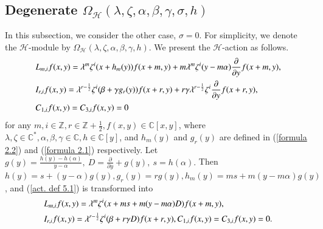 \documentclass[12pt,reqno]{amsart}
\def\Z{\mathbb{Z}}
\def\C{\mathbb{C}}
\numberwithin{equation}{section}
\begin{document}
\subsection{\texorpdfstring{ Degenerate $\Omega_{\mathcal{H}}(\lambda,\zeta,\alpha,\beta,\gamma,\sigma,h)$ }{1}}
In this subsection, we consider the other case, $\sigma=0$. For simplicity, we denote the $\mathcal{H}$-module by 
$\Omega_{\mathcal{H}}(\lambda,\zeta,\alpha,\beta,\gamma,h)$. We present the $\mathcal{H}$-action as follows.
\begin{equation}\label{act. def 5.1}
\aligned
&L_{m,i} f(x,y)=\lambda^m\zeta^i(x+h_{m}(y))f(x+m,y)+m\lambda^m\zeta^i(y-m\alpha)\frac{\partial }{\partial {y}}{f(x+m,y)},\\
&I_{r,i} f(x,y)=\lambda^{r-\frac{1}{2}}\zeta^i(\beta+\gamma g_{r}(y))f(x+r,y)+r\gamma\lambda^{r-\frac{1}{2}}\zeta^i\frac{\partial }{\partial {y}}{f(x+r,y)},\\ 
&C_{1,i}f(x,y)=C_{3,i}f(x,y)=0
\endaligned
\end{equation}
for any $m,i\in\Z,r\in\Z+\frac{1}{2}, f(x,y)\in\C[x,y]$, where $\lambda,\zeta\in\C^*,\alpha,\beta,\gamma\in\C,h\in \C[y]$, and $h_m(y)$ and $g_r(y)$ are defined in (\ref{formula 2.2}) and (\ref{formula 2.1}) respectively.  Let $g(y)=\frac{h(y)-h(\alpha)}{y-\alpha},\ D=\frac{\partial}{\partial{y}}+g(y),\ s=h(\alpha).$
Then $h(y)=s+(y-\alpha)g(y),g_r(y)=rg(y), h_m(y)=ms+m(y-m\alpha)g(y)$, and (\ref{act. def 5.1}) is transformed into
\begin{equation*}\label{act. def 6.2}
\aligned
&L_{m,i} f(x,y)=\lambda^m\zeta^i(x+ms+m(y-m\alpha)D)f(x+m,y),  \\
&I_{r,i} f(x,y)=\lambda^{r-\frac{1}{2}}\zeta^i(\beta+r\gamma D)f(x+r,y),
C_{1,i}f(x,y)=C_{3,i}f(x,y)=0.
\endaligned
\end{equation*}
\end{document}

